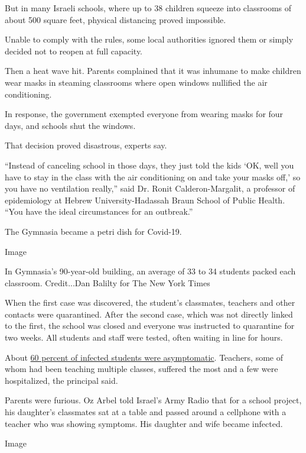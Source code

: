 But in many Israeli schools, where up to 38 children squeeze into
classrooms of about 500 square feet, physical distancing proved
impossible.

Unable to comply with the rules, some local authorities ignored them or
simply decided not to reopen at full capacity.

Then a heat wave hit. Parents complained that it was inhumane to make
children wear masks in steaming classrooms where open windows nullified
the air conditioning.

In response, the government exempted everyone from wearing masks for
four days, and schools shut the windows.

That decision proved disastrous, experts say.

``Instead of canceling school in those days, they just told the kids
`OK, well you have to stay in the class with the air conditioning on and
take your masks off,' so you have no ventilation really,'' said Dr.
Ronit Calderon-Margalit, a professor of epidemiology at Hebrew
University-Hadassah Braun School of Public Health. ``You have the ideal
circumstances for an outbreak.''

The Gymnasia became a petri dish for Covid-19.

Image

In Gymnasia's 90-year-old building, an average of 33 to 34 students
packed each classroom. Credit...Dan Balilty for The New York Times

When the first case was discovered, the student's classmates, teachers
and other contacts were quarantined. After the second case, which was
not directly linked to the first, the school was closed and everyone was
instructed to quarantine for two weeks. All students and staff were
tested, often waiting in line for hours.

About
\href{https://www.eurosurveillance.org/content/10.2807/1560-7917.ES.2020.25.29.2001352?mc_source=MTExMDY2Ojo6OTgxM2NkZDM4OGRjNGFlM2JhY2RhNWIyZTNlODhkOTE6OnYzOjoxNTk2NDc1MjIzOjox\#html_fulltext}{60
percent of infected students were asymptomatic}. Teachers, some of whom
had been teaching multiple classes, suffered the most and a few were
hospitalized, the principal said.

Parents were furious. Oz Arbel told Israel's Army Radio that for a
school project, his daughter's classmates sat at a table and passed
around a cellphone with a teacher who was showing symptoms. His daughter
and wife became infected.

Image

